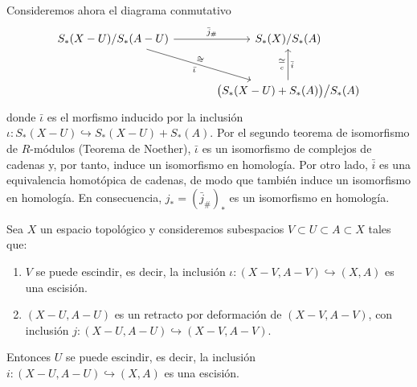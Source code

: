 \begin{dem}
Consideremos ahora el diagrama conmutativo
\[
\begin{tikzcd}[column sep=3.4em, row sep=2.8em]
S_*(X - U)/S_*(A - U)
    \arrow[r, "\bar{j}_\#"]
    \arrow[dr, "\bar{\iota}"', "\cong"{sloped}]
    & S_*(X)/S_*(A) \\
& \bigl(S_*(X - U) + S_*(A)\bigr)\big/S_*(A)
    \arrow[u, "\bar{i}"', "\underset{c}{\simeq}"]
\end{tikzcd}
\]
donde $\bar{\iota}$ es el morfismo inducido por la inclusión $\iota \colon S_*(X - U) \hookrightarrow S_*(X - U) + S_*(A)$. Por el segundo teorema de isomorfismo de $R$-módulos (Teorema de Noether), $\bar{\iota}$ es un isomorfismo de complejos de cadenas y, por tanto, induce un isomorfismo en homología. Por otro lado, $\bar{i}$ es una equivalencia homotópica de cadenas, de modo que también induce un isomorfismo en homología. En consecuencia, $j_* = (\bar{j}_\#)_*$ es un isomorfismo en homología.
\end{dem}



\begin{prop}
Sea $X$ un espacio topológico y consideremos subespacios $V \subset U \subset A \subset X$ tales que:
\begin{enumerate}
    \item $V$ se puede escindir, es decir, la inclusión $\iota \colon (X - V, A - V) \hookrightarrow (X, A)$ es una escisión.
    \item $(X - U, A - U)$ es un retracto por deformación de $(X - V, A - V)$, con inclusión $j \colon (X - U, A - U) \hookrightarrow (X - V, A - V)$.
\end{enumerate}
Entonces $U$ se puede escindir, es decir, la inclusión $i \colon (X - U, A - U) \hookrightarrow (X, A)$ es una escisión.
\end{prop}

